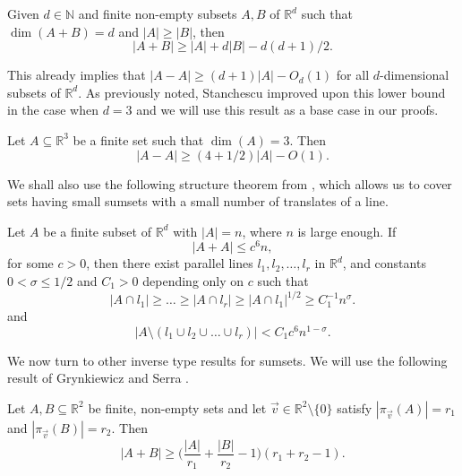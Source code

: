  \begin{lemma} \label{1ruzsa}
Given $d \in \mathbb{N}$ and finite non-empty subsets $A, B$ of $\mathbb{R}^d$ such that $\dim(A+B) =d$ and $|A| \geq |B|$, then 
\begin{equation} \label{ruzsa4}
 |A+B| \geq |A| + d |B| - d(d+1)/2. 
 \end{equation}
 \end{lemma}
 
This already implies that $|A-A| \geq (d+1)|A| - O_{d}(1)$ for all $d$-dimensional subsets of $\mathbb{R}^d$. As previously noted, Stanchescu \cite{St1998} improved upon this lower bound in the case when $d=3$ and we will use this result as a base case in our proofs.
 
\begin{lemma} \label{stanc}
Let $A \subseteq \mathbb{R}^3$ be a finite set such that $\dim(A) = 3$. Then 
\[ |A-A| \geq (4 + 1/2) |A| - O(1). \]
\end{lemma}

We shall also use the following structure theorem from \cite{Ak2019}, which allows us to cover sets having small sumsets with a small number of translates of a line.
 
 
\begin{lemma} \label{fri}
Let $A$ be a finite subset of $\mathbb{R}^d$ with $|A| = n$, where $n$ is large enough. If
\begin{equation} \label{ti} |A+A| \leq c^6n, \end{equation}
for some $c > 0$, then there exist parallel lines $l_1, l_2, \dots, l_r$ in $\mathbb{R}^d$, and constants $0 < \sigma \leq 1/2$ and $C_1 > 0$ depending only on $c$ such that 
\[ |A \cap l_1| \geq \dots \geq  |A \cap l_r| \geq  |A \cap l_1|^{1/2} \geq C_1^{-1} n^{\sigma}. \]
and 
\[ |A\setminus (l_1 \cup l_2 \cup \dots \cup l_r)| < C_1 c^6 n^{1-\sigma}. \] 

\end{lemma}

We now turn to other inverse type results for sumsets. We will use the following result of Grynkiewicz and Serra \cite[Theorem 1.3]{GS2010}.

\begin{lemma} \label{gsne2}
Let $A, B \subseteq \mathbb{R}^2$ be finite, non-empty sets and let $\vec{v} \in \mathbb{R}^2 \setminus \{0\}$ satisfy $|\pi_{\vec{v}}(A)| = r_1$ and $|\pi_{\vec{v}}(B)| = r_2$. Then
\begin{equation}  \label{gs1}
 |A+B| \geq \bigg( \frac{|A|}{r_1} + \frac{|B|}{r_2} - 1 \bigg)  (r_1 + r_2 - 1). 
\end{equation}
\end{lemma}

